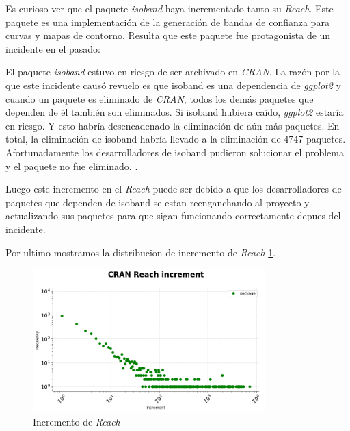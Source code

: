 Es curioso ver que el paquete \textit{isoband} haya incrementado tanto su \textit{Reach}.
Este paquete es una implementación de la generación de bandas de confianza para curvas y mapas de contorno.
Resulta que este paquete fue protagonista de un incidente en el pasado:

El paquete \textit{isoband} estuvo en riesgo de ser archivado en \textit{CRAN}. La razón por la que este incidente causó
revuelo es que isoband es una dependencia de \textit{ggplot2} y cuando un paquete es eliminado de \textit{CRAN}, todos los
demás paquetes que dependen de él también son eliminados. Si isoband hubiera caído, \textit{ggplot2} estaría en
riesgo. Y esto habría desencadenado la eliminación de aún más paquetes. En total, la eliminación de
isoband habría llevado a la eliminación de 4747 paquetes\cite{r-bloggers_isoband_incident}.
Afortunadamente los desarrolladores de isoband pudieron solucionar el problema y el paquete no fue eliminado.
\cite{isoband_issue}.

Luego este incremento en el \textit{Reach} puede ser debido a que los desarrolladores de paquetes que dependen de isoband
se estan reenganchando al proyecto y actualizando sus paquetes para que sigan funcionando correctamente depues del incidente.



Por ultimo mostramos la distribucion de incremento de \textit{Reach} \ref{fig:Incremento de Reach}.

\begin{figure}[h!]
    \begin{center}
        \includegraphics[width=0.8\textwidth]{img/cran/reach_increment.png}
        \caption{Incremento de \textit{Reach}}
        \label{fig:Incremento de Reach}
    \end{center}
\end{figure}


\newpage


